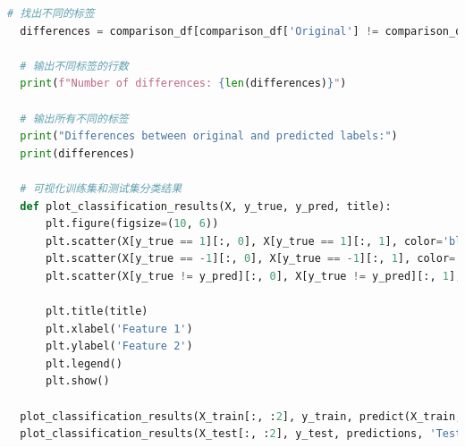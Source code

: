 \documentclass[12pt]{article}
\begin{document}
\begin{lstlisting}[language=Python]
  # 找出不同的标签
  differences = comparison_df[comparison_df['Original'] != comparison_df['Predicted']]
  
  # 输出不同标签的行数
  print(f"Number of differences: {len(differences)}")
  
  # 输出所有不同的标签
  print("Differences between original and predicted labels:")
  print(differences)
  
  # 可视化训练集和测试集分类结果
  def plot_classification_results(X, y_true, y_pred, title):
      plt.figure(figsize=(10, 6))
      plt.scatter(X[y_true == 1][:, 0], X[y_true == 1][:, 1], color='blue', label='Positive Class (Original)')
      plt.scatter(X[y_true == -1][:, 0], X[y_true == -1][:, 1], color='red', label='Negative Class (Original)')
      plt.scatter(X[y_true != y_pred][:, 0], X[y_true != y_pred][:, 1], color='yellow', edgecolor='black', label='Misclassified')
  
      plt.title(title)
      plt.xlabel('Feature 1')
      plt.ylabel('Feature 2')
      plt.legend()
      plt.show()
  
  plot_classification_results(X_train[:, :2], y_train, predict(X_train, alphas, b, X_train, y_train), 'Training Set Classification Results(SMO)')
  plot_classification_results(X_test[:, :2], y_test, predictions, 'Test Set Classification Results(SMO)')  

\end{lstlisting}
\end{document}
